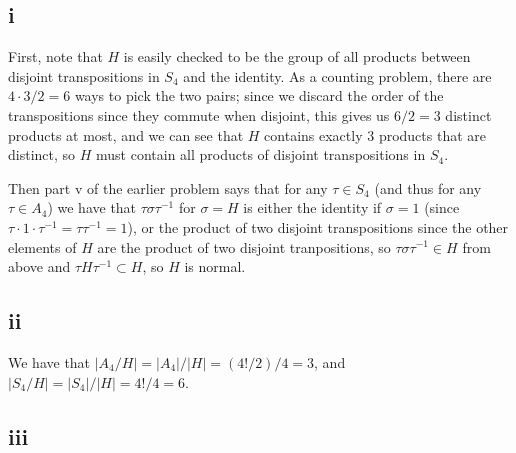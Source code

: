 \documentclass[12pt,letterpaper]{article}
\theoremstyle{definition}
\begin{document}
\subsection*{i}

First, note that $H$ is easily checked to be the group of all products between disjoint transpositions in $S_{4}$ and the identity. As a counting problem, there are $4 \cdot 3 / 2 = 6$ ways to pick the two pairs; since we discard the order of the transpositions since they commute when disjoint, this gives us $6 / 2 = 3$ distinct products at most, and we can see that $H$ contains exactly 3 products that are distinct, so $H$ must contain all products of disjoint transpositions in $S_{4}$.

Then part v of the earlier problem says that for any $\tau \in S_{4}$ (and thus for any $\tau \in A_{4}$) we have that $\tau \sigma \tau^{-1}$ for $\sigma = H$ is either the identity if $\sigma = 1$ (since $\tau \cdot 1 \cdot \tau^{-1} = \tau\tau^{-1} = 1$), or the product of two disjoint transpositions since the other elements of $H$ are the product of two disjoint tranpositions, so $\tau \sigma \tau^{-1} \in H$ from above and $\tau H \tau^{-1} \subset H$, so $H$ is normal.

\subsection*{ii}

We have that $|A_{4}/H| = |A_{4}|/|H| = (4!/2)/4 = 3$, and $|S_{4}/H| = |S_{4}|/|H| = 4!/4 = 6$.

\subsection*{iii}
\end{document}
